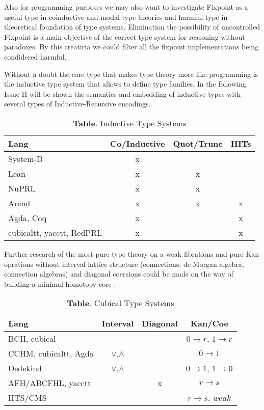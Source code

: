 \documentclass{article}
\theoremstyle{definition}
\begin{document}
Also for programming purposes we may also want to investigate Fixpoint as a useful
type in coinductive and modal type theories and harmful type in theoretical foundation of type systems.
Elimination the possibility of uncontrolled Fixpoint is a main objective of the correct type system
for reasoning without paradoxes. By this creatiria we could filter all the fixpoint implementations being condidered harmful.

Without a doubt the core type that makes type theory more
like programming is the inductive type system that allows to
define type families. In the following Issue II will be shown
the semantics and embedding of inductive types with several types
of Inductive-Recursive encodings.

\begin{table}[!ht]
  \centering
  \caption*{\textbf{Table}. Inductive Type Systems}
  \begin{adjustbox}{width=\columnwidth,center}
  \begin{tabular}{lccc}
    \hline
       Lang & Co/Inductive & Quot/Trunc & HITs\\
    \hline
       System-D & x\\
       Lean & x & x\\
       NuPRL & x & x\\
       Arend & x & x & x\\
       Agda, Coq & x & & x\\
       cubicaltt, yacctt, RedPRL & x & & x\\
  \end{tabular}
  \end{adjustbox}
\end{table}

Further research of the most pure type theory on a weak fibrations and pure Kan
oprations without interval lattice structure (connections, de Morgan algebra, connection
algebras) and diagonal coersions could be made on the way of building a minimal homotopy core \cite{Cavallo19}.

\begin{table}[!ht]
  \centering
  \caption*{\textbf{Table}. Cubical Type Systems}
  \begin{adjustbox}{width=\columnwidth,center}
  \begin{tabular}{lccc}
    \hline
       Lang & Interval & Diagonal & Kan/Coe\\
    \hline
       BCH, cubical        & & & $0\rightarrow r$, $1 \rightarrow r$\\
       CCHM, cubicaltt, Agda       & $\lor$,$\land$ & & $0 \rightarrow 1$\\
       Dedekind          & $\lor$,$\land$ & & $0 \rightarrow 1$, $1 \rightarrow 0$\\
       AFH/ABCFHL, yacctt & & x & $r \rightarrow s$\\
       HTS/CMS    & &   & $r \rightarrow s$, $weak$\\
  \end{tabular}
  \end{adjustbox}
\end{table}
\end{document}
